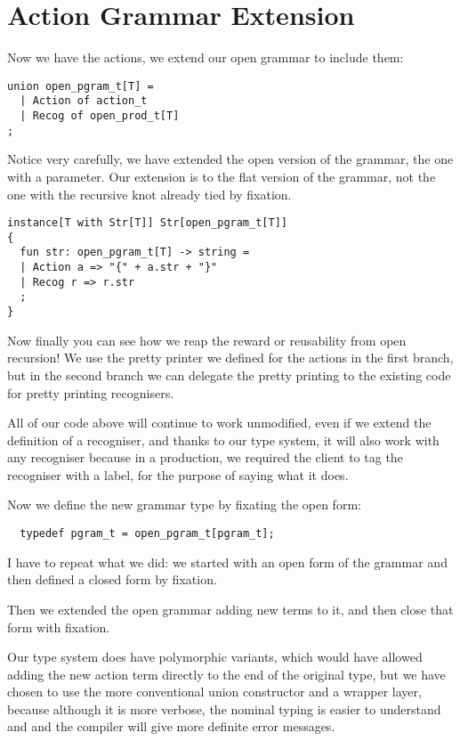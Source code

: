 \documentclass[oneside]{book}
\begin{document}
\section{Action Grammar Extension}
Now we have the actions, we extend our open grammar to
include them:

\begin{verbatim}
union open_pgram_t[T] = 
  | Action of action_t
  | Recog of open_prod_t[T]
;
\end{verbatim}

Notice very carefully, we have extended the open version
of the grammar, the one with a parameter. Our extension
is to the flat version of the grammar, not the one with
the recursive knot already tied by fixation.

\begin{verbatim}
instance[T with Str[T]] Str[open_pgram_t[T]] 
{
  fun str: open_pgram_t[T] -> string =
  | Action a => "{" + a.str + "}"
  | Recog r => r.str
  ;
}
\end{verbatim}

Now finally you can see how we reap the reward or
reusability from open recursion! We use the pretty
printer we defined for the actions in the first branch,
but in the second branch we can delegate the pretty
printing to the existing code for pretty printing
recognisers.

All of our code above will continue to work unmodified,
even if we extend the definition of a recogniser,
and thanks to our type system, it will also work
with any recogniser because in a production, we required
the client to tag the recogniser with a label, for
the purpose of saying what it does.

Now we define the new grammar type by fixating the
open form:
    
\begin{verbatim}
  typedef pgram_t = open_pgram_t[pgram_t];
\end{verbatim}

I have to repeat what we did: we started with an open form
of the grammar and then defined a closed form by fixation.

Then we extended the open grammar adding new terms to it,
and then close that form with fixation. 

Our type system does have polymorphic variants, which would
have allowed adding the new action term directly to the
end of the original type, but we have chosen to use the
more conventional union constructor and a wrapper
layer, because although it is more verbose, the nominal
typing is easier to understand and and the compiler will
give more definite error messages.
\end{document}
